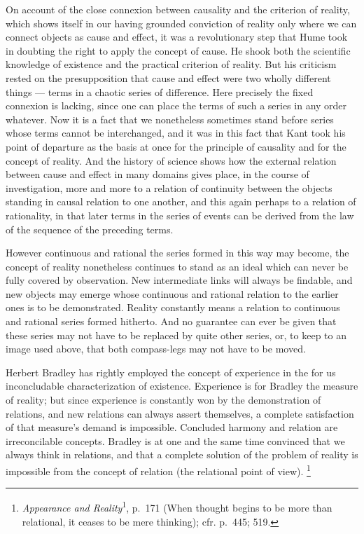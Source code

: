 \documentclass[12pt]{article}
\newcommand{\opage}[1]{\marginnote{\footnotesize\textit{[#1]}}}
\begin{document}

On account of the close connexion between causality and the criterion of
reality, which shows itself in our having grounded conviction of reality
only where we can connect objects as cause and effect, it was a
revolutionary step that Hume took in doubting the right to apply the concept
of cause. He shook both the scientific knowledge of existence and the
practical criterion of reality. But his criticism rested on the
presupposition that cause and effect were two wholly different things ---
terms in a chaotic series of difference. Here precisely the fixed connexion
is lacking, since one can place the terms of such a series in any order
whatever. Now it is a fact that we nonetheless sometimes stand before series
whose terms cannot be interchanged, and it was in this fact that Kant took
his point of departure as the basis at once for the principle of causality
and for the concept of reality. And the history of science shows how the
external relation between cause and effect in many domains gives place, in
the course of investigation, more and more to a relation of continuity
between the objects \opage{48}standing in causal relation to one another, and this
again perhaps to a relation of rationality, in that later terms in the
series of events can be derived from the law of the sequence of the
preceding terms.

However continuous and rational the series formed in this way may become,
the concept of reality nonetheless continues to stand as an ideal which can
never be fully covered by observation. New intermediate links will always be
findable, and new objects may emerge whose continuous and rational relation
to the earlier ones is to be demonstrated. Reality constantly means a
relation to continuous and rational series formed hitherto. And no guarantee
can ever be given that these series may not have to be replaced by quite
other series, or, to keep to an image used above, that both compass-legs may
not have to be moved.

Herbert Bradley has rightly employed the concept of experience in the for us
inconcludable characterization of existence. Experience is for Bradley the
measure of reality; but since experience is constantly won by the
demonstration of relations, and new relations can always assert themselves,
a complete satisfaction of that measure's demand is impossible. Concluded
harmony and relation are irreconcilable concepts. Bradley is at one and the
same time convinced that we always think in relations, and that a complete
solution of the problem of reality is impossible from the concept of
relation (the relational point of view).%
\footnote{\textit{Appearance and Reality}\textsuperscript{1}, p.~171 (When
thought begins to be more than relational, it ceases to be mere thinking);
cfr. p.~445; 519.}
\end{document}
